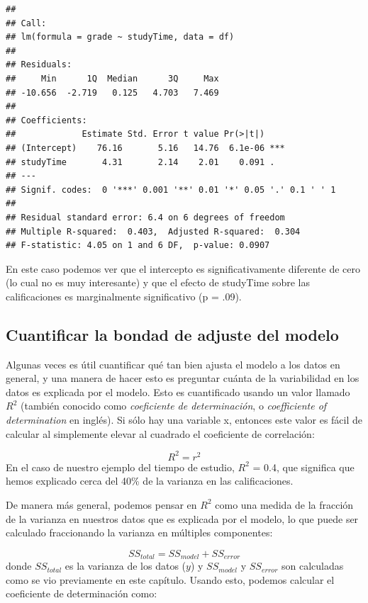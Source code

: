 \documentclass[
  12pt,
]{book}
\begin{document}
\begin{verbatim}
## 
## Call:
## lm(formula = grade ~ studyTime, data = df)
## 
## Residuals:
##     Min      1Q  Median      3Q     Max 
## -10.656  -2.719   0.125   4.703   7.469 
## 
## Coefficients:
##             Estimate Std. Error t value Pr(>|t|)    
## (Intercept)    76.16       5.16   14.76  6.1e-06 ***
## studyTime       4.31       2.14    2.01    0.091 .  
## ---
## Signif. codes:  0 '***' 0.001 '**' 0.01 '*' 0.05 '.' 0.1 ' ' 1
## 
## Residual standard error: 6.4 on 6 degrees of freedom
## Multiple R-squared:  0.403,	Adjusted R-squared:  0.304 
## F-statistic: 4.05 on 1 and 6 DF,  p-value: 0.0907
\end{verbatim}

En este caso podemos ver que el intercepto es significativamente diferente de cero (lo cual no es muy interesante) y que el efecto de studyTime sobre las calificaciones es marginalmente significativo (p = .09).

\hypertarget{cuantificar-la-bondad-de-adjuste-del-modelo}{%
\subsection{Cuantificar la bondad de adjuste del modelo}\label{cuantificar-la-bondad-de-adjuste-del-modelo}}

Algunas veces es útil cuantificar qué tan bien ajusta el modelo a los datos en general, y una manera de hacer esto es preguntar cuánta de la variabilidad en los datos es explicada por el modelo. Esto es cuantificado usando un valor llamado \(R^2\) (también conocido como \emph{coeficiente de determinación}, o \emph{coefficiente of determination} en inglés). Si sólo hay una variable x, entonces este valor es fácil de calcular al simplemente elevar al cuadrado el coeficiente de correlación:

\[
R^2 = r^2
\]
En el caso de nuestro ejemplo del tiempo de estudio, \(R^2\) = 0.4, que significa que hemos explicado cerca del 40\% de la varianza en las calificaciones.

De manera más general, podemos pensar en \(R^2\) como una medida de la fracción de la varianza en nuestros datos que es explicada por el modelo, lo que puede ser calculado fraccionando la varianza en múltiples componentes:

\[
SS_{total} = SS_{model} + SS_{error}
\]
donde \(SS_{total}\) es la varianza de los datos (\(y\)) y \(SS_{model}\) y \(SS_{error}\) son calculadas como se vio previamente en este capítulo. Usando esto, podemos calcular el coeficiente de determinación como:
\end{document}
